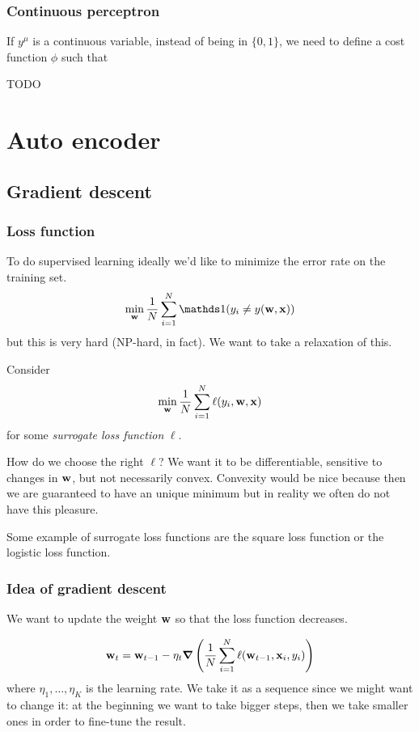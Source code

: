 \documentclass[12pt]{extarticle}
\renewcommand{\vec}[1]{\bvec{#1}}
\begin{document}
\subsubsection{Continuous perceptron}
If $y^\mu$ is a continuous variable, instead of being in $\{0, 1\}$, we need to define a cost
function $\phi$ such that

TODO

\section{Auto encoder}

\subsection{Gradient descent}
\subsubsection{Loss function}

To do supervised learning ideally we'd like to minimize the error rate on the training set.
\begin{equation}
	\min_{\vec w} \frac{1}{N} \sum_{i = 1}^N \mathds 1(y_i \neq y(\vec w, \vec x))
\end{equation}
but this is very hard (NP-hard, in fact). We want to take a relaxation of this.

Consider
\begin{equation}
	\min_{\vec w} \frac{1}{N} \sum_{i = 1}^N \ell(y_i, \vec w, \vec x)
\end{equation}
for some \emph{surrogate loss function} $\ell$.

How do we choose the right $\ell$? We want it to be differentiable, sensitive to changes in
$\vec w$, but not necessarily convex.
Convexity would be nice because then we are guaranteed to have an unique minimum but in reality we
often do not have this pleasure.

Some example of surrogate loss functions are the square loss function or the logistic loss function.

\subsubsection{Idea of gradient descent}

We want to update the weight $\vec w$ so that the loss function decreases.

\begin{equation}
	\vec w_{t} = \vec w_{t-1} - \eta_t \grad \left(\frac{1}{N}\sum_{i = 1}^N
	\ell(\vec w_{t-1}, \vec x_i, y_i) \right)
\end{equation}
where $\eta_1, \dots, \eta_K$ is the learning rate. We take it as a sequence since we might want to
change it: at the beginning we want to take bigger steps, then we take smaller ones in order to
fine-tune the result.
\end{document}
